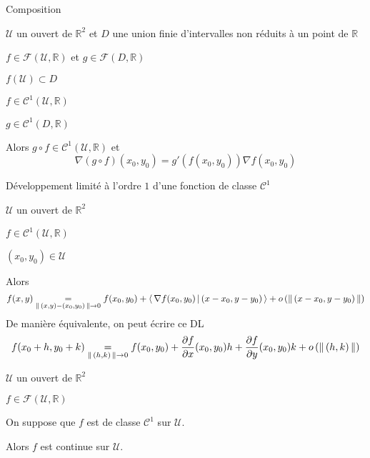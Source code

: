     \begin{prop}{Composition}{}
        \begin{soient}
            \item $ \mathcal{U}$ un ouvert de $\mathbb{R}^2$ et $D$ une union finie d’intervalles non réduits à un point de $\mathbb{R}$
            \item $f \in \mathcal{F}(\mathcal{U},\mathbb{R})$ et $g \in \mathcal{F}(D,\mathbb{R})$
        \end{soient}
        \begin{suppose}
            \item $f(\mathcal{U}) \subset D$
            \item $f \in \mathcal{C}^1(\mathcal{U},\mathbb{R})$
            \item $g \in \mathcal{C}^1(D,\mathbb{R})$
        \end{suppose}
        Alors $g \circ f \in \mathcal{C}^1(\mathcal{U},\mathbb{R})$ et 
        \[ \nabla (g \circ f)(x_0,y_0) = g'(f(x_0,y_0)) \nabla f(x_0,y_0) \] 
    \end{prop}

    \begin{theo}{Développement limité à l’ordre $1$ d’une fonction de classe $\mathcal{C}^1$}{}
        \begin{soient}
            \item $\mathcal{U}$ un ouvert de $\mathbb{R}^2$
            \item $f\in \mathcal{C}^1(\mathcal{U},\mathbb{R})$
            \item $(x_0,y_0) \in \mathcal{U}$
        \end{soient}
        Alors \[  f(x,y) \underset{\left\lVert\,(x,y)-(x_0,y_0)\,\right\rVert \rightarrow 0}{=} f(x_0,y_0) + \left<\,\nabla f(x_0,y_0)\,\middle|\,(x-x_0,y-y_0)\,\right> + o\left(\left\lVert\,(x-x_0,y-y_0)\,\right\rVert\right) \]
        De manière équivalente, on peut écrire ce DL
        \[ f(x_0 + h,y_0 + k) \underset{\left\lVert\,(h,k)\,\right\rVert \rightarrow 0}{=} f(x_0,y_0) + \frac{\partial f}{\partial x}(x_0,y_0) h + \frac{\partial f}{\partial y}(x_0,y_0)k + o\left(\left\lVert\,(h,k)\,\right\rVert\right) \]
    \end{theo}

    \begin{coro}{}{}
        \begin{soient}
            \item $\mathcal{U}$ un ouvert de $\mathbb{R}^2$
            \item $f\in \mathcal{F}(\mathcal{U},\mathbb{R})$
        \end{soient}
        On suppose que $f$ est de classe $\mathcal{C}^1$ sur $\mathcal{U}$.

        Alors $f$ est continue sur $\mathcal{U}$.
    \end{coro}

